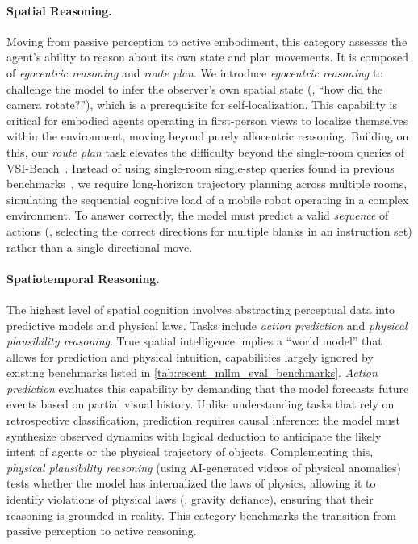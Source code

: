 \paragraph{Spatial Reasoning.} Moving from passive perception to active embodiment, this category assesses the agent's ability to reason about its own state and plan movements.
It is composed of \textit{egocentric reasoning} and \textit{route plan}.
We introduce \textit{egocentric reasoning} to challenge the model to infer the observer's own spatial state (\eg, ``how did the camera rotate?''), which is a prerequisite for self-localization.
This capability is critical for embodied agents operating in first-person views to localize themselves within the environment, moving beyond purely allocentric reasoning.
Building on this, our \textit{route plan} task elevates the difficulty beyond the single-room queries of VSI-Bench~\cite{Yang_2025_CVPR}.
Instead of using single-room single-step queries found in previous benchmarks~\cite{Yang_2025_CVPR}, we require long-horizon trajectory planning across multiple rooms, simulating the sequential cognitive load of a mobile robot operating in a complex environment.
To answer correctly, the model must predict a valid \textit{sequence} of actions (\eg, selecting the correct directions for multiple blanks in an instruction set) rather than a single directional move.

\paragraph{Spatiotemporal Reasoning.}
The highest level of spatial cognition involves abstracting perceptual data into predictive models and physical laws.
Tasks include \textit{action prediction} and \textit{physical plausibility reasoning}.
True spatial intelligence implies a ``world model'' that allows for prediction and physical intuition, capabilities largely ignored by existing benchmarks listed in \cref{tab:recent_mllm_eval_benchmarks}.
\textit{Action prediction} evaluates this capability by demanding that the model forecasts future events based on partial visual history.
Unlike understanding tasks that rely on retrospective classification, prediction requires causal inference: the model must synthesize observed dynamics with logical deduction to anticipate the likely intent of agents or the physical trajectory of objects.
Complementing this, \textit{physical plausibility reasoning} (using AI-generated videos of physical anomalies) tests whether the model has internalized the laws of physics, allowing it to identify violations of physical laws (\eg, gravity defiance), ensuring that their reasoning is grounded in reality.
This category benchmarks the transition from passive perception to active reasoning.
